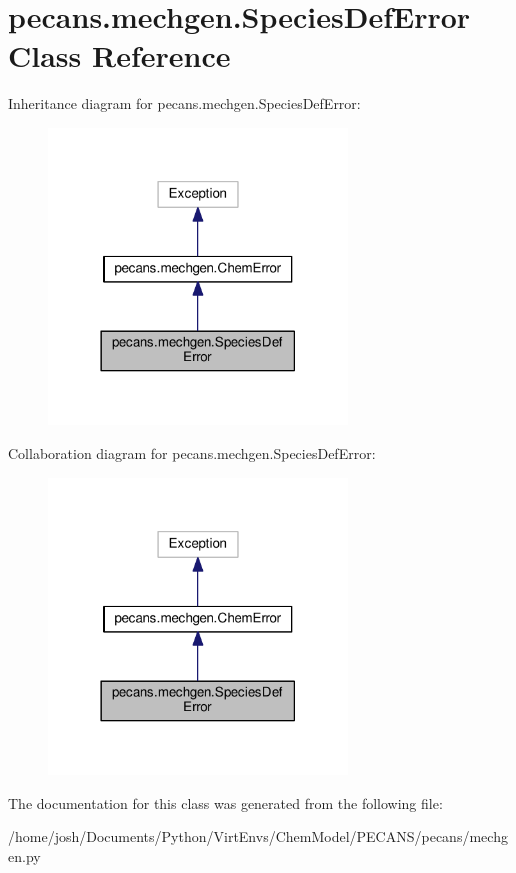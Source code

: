 \hypertarget{classpecans_1_1mechgen_1_1SpeciesDefError}{}\section{pecans.\+mechgen.\+Species\+Def\+Error Class Reference}
\label{classpecans_1_1mechgen_1_1SpeciesDefError}


Inheritance diagram for pecans.\+mechgen.\+Species\+Def\+Error\+:\nopagebreak
\begin{figure}[H]
\begin{center}
\leavevmode
\includegraphics[width=225pt]{classpecans_1_1mechgen_1_1SpeciesDefError__inherit__graph}
\end{center}
\end{figure}


Collaboration diagram for pecans.\+mechgen.\+Species\+Def\+Error\+:\nopagebreak
\begin{figure}[H]
\begin{center}
\leavevmode
\includegraphics[width=225pt]{classpecans_1_1mechgen_1_1SpeciesDefError__coll__graph}
\end{center}
\end{figure}


The documentation for this class was generated from the following file\+:\begin{DoxyCompactItemize}
\item 
/home/josh/\+Documents/\+Python/\+Virt\+Envs/\+Chem\+Model/\+P\+E\+C\+A\+N\+S/pecans/mechgen.\+py\end{DoxyCompactItemize}
